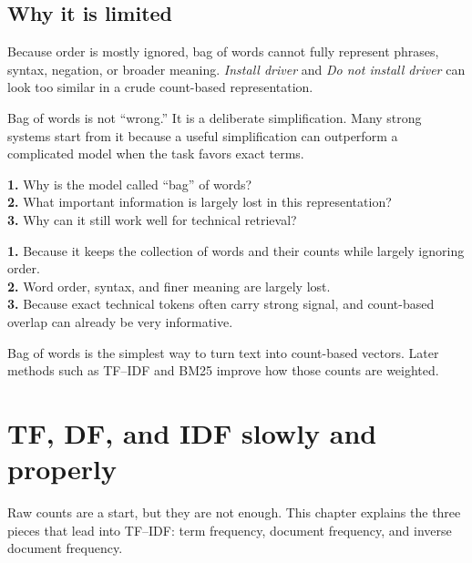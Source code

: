 \documentclass[11pt,oneside]{report}
\begin{document}
\section*{Why it is limited}
Because order is mostly ignored, bag of words cannot fully represent phrases, syntax, negation, or broader meaning. \emph{Install driver} and \emph{Do not install driver} can look too similar in a crude count-based representation.

\begin{warningbox}
Bag of words is not ``wrong.'' It is a deliberate simplification. Many strong systems start from it because a useful simplification can outperform a complicated model when the task favors exact terms.
\end{warningbox}

\begin{selfcheckbox}
\textbf{1.} Why is the model called ``bag'' of words?\\
\textbf{2.} What important information is largely lost in this representation?\\
\textbf{3.} Why can it still work well for technical retrieval?
\end{selfcheckbox}

\begin{answerbox}
\textbf{1.} Because it keeps the collection of words and their counts while largely ignoring order.\\
\textbf{2.} Word order, syntax, and finer meaning are largely lost.\\
\textbf{3.} Because exact technical tokens often carry strong signal, and count-based overlap can already be very informative.
\end{answerbox}

\begin{rememberbox}
Bag of words is the simplest way to turn text into count-based vectors. Later methods such as TF--IDF and BM25 improve how those counts are weighted.
\end{rememberbox}


\chapter[TF, DF, and IDF]{TF, DF, and IDF slowly and properly}

\begin{purposebox}
Raw counts are a start, but they are not enough. This chapter explains the three pieces that lead into TF--IDF: term frequency, document frequency, and inverse document frequency.
\end{purposebox}
\end{document}
